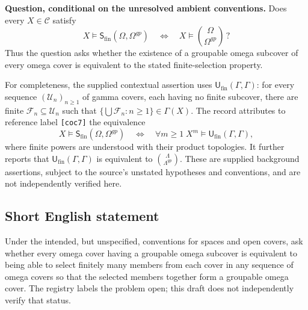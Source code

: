 \documentclass[11pt]{article}
\begin{document}
\textbf{Question, conditional on the unresolved ambient conventions.} Does every \(X\in\mathcal C\) satisfy
\[
X\models\mathsf S_{\mathrm{fin}}(\Omega,\Omega^{gp})
\quad\Longleftrightarrow\quad
X\models\binom{\Omega}{\Omega^{gp}}\,?
\]
Thus the question asks whether the existence of a groupable omega subcover of every omega cover is equivalent to the stated finite-selection property.

For completeness, the supplied contextual assertion uses \(\mathsf U_{\mathrm{fin}}(\Gamma,\Gamma)\): for every sequence \((\mathcal U_n)_{n\geq1}\) of gamma covers, each having no finite subcover, there are finite \(\mathcal F_n\subseteq\mathcal U_n\) such that \(\{\bigcup\mathcal F_n:n\geq1\}\in\Gamma(X)\). The record attributes to reference label \texttt{[coc7]} the equivalence
\[
X\models\mathsf S_{\mathrm{fin}}(\Omega,\Omega^{gp})
\quad\Longleftrightarrow\quad
\forall m\geq1\;
X^m\models\mathsf U_{\mathrm{fin}}(\Gamma,\Gamma),
\]
where finite powers are understood with their product topologies. It further reports that \(\mathsf U_{\mathrm{fin}}(\Gamma,\Gamma)\) is equivalent to \(\binom{\Lambda}{\Lambda^{gp}}\). These are supplied background assertions, subject to the source's unstated hypotheses and conventions, and are not independently verified here.
\subsection{Short English statement}
Under the intended, but unspecified, conventions for spaces and open covers, ask whether every omega cover having a groupable omega subcover is equivalent to being able to select finitely many members from each cover in any sequence of omega covers so that the selected members together form a groupable omega cover. The registry labels the problem open; this draft does not independently verify that status.
\end{document}
